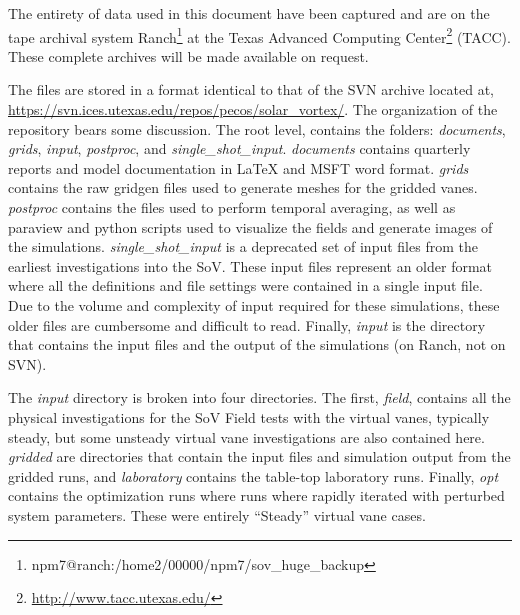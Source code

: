 \label{sec:archiving}


The entirety of data used in this document have been captured and
are on the tape archival system
Ranch\footnote{\normalsize npm7@ranch:/home2/00000/npm7/sov\_huge\_backup} 
at the Texas Advanced Computing Center\footnote{%
    \normalsize \url{http://www.tacc.utexas.edu/}
}
(TACC).  These complete archives will be made available on request. 

The files are stored in a format identical to that of the SVN archive
located at,
\url{https://svn.ices.utexas.edu/repos/pecos/solar_vortex/}. The
organization of the repository bears some discussion. The root level,
contains the folders: {\it documents}, {\it grids}, {\it input}, {\it
postproc}, and {\it single\_shot\_input}. {\it documents} contains
quarterly reports and model documentation in LaTeX and MSFT word format.  
{\it grids} contains the raw gridgen files used to generate meshes for
the gridded vanes. {\it postproc} contains the files used to perform
temporal averaging, as well as paraview and python scripts used to
visualize the fields and generate images of the simulations. {\it
single\_shot\_input} is a deprecated set of input files from the
earliest investigations into the SoV. These input files represent an
older format where all the definitions and file settings were contained
in a single input file. Due to the volume and complexity of input
required for these simulations, these older files are cumbersome and
 difficult to read. Finally, {\it input} is the directory that
contains the input files and the output of the simulations (on
Ranch, not on SVN). 

The {\it input} directory is broken into four directories. The first,
{\it field}, contains all the physical investigations for the SoV Field
tests with the virtual vanes, typically steady, but some unsteady
virtual vane investigations are also contained here. {\it gridded} are
directories that contain the input files and simulation output from the
gridded runs, and {\it laboratory} contains the table-top laboratory
runs. Finally, {\it opt} contains the optimization runs where runs where
rapidly iterated with perturbed system parameters. These were entirely
``Steady'' virtual vane cases. 

